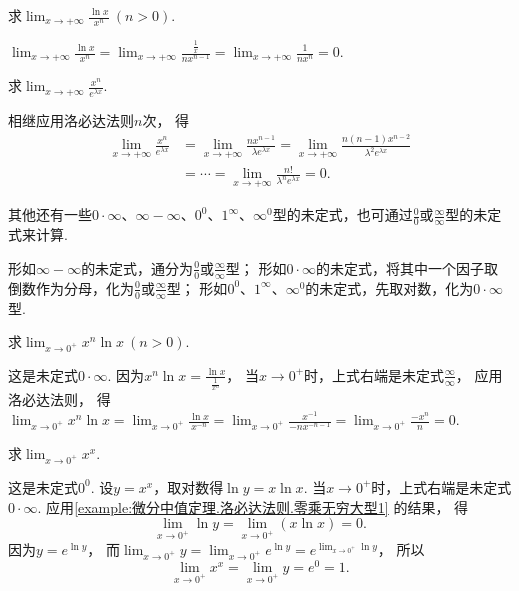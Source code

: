 \begin{example}
求\(\lim_{x\to+\infty} \frac{\ln x}{x^n}\ (n>0)\).
\begin{solution}
\(\lim_{x\to+\infty} \frac{\ln x}{x^n}
= \lim_{x\to+\infty} \frac{\frac{1}{x}}{n x^{n-1}}
= \lim_{x\to+\infty} \frac{1}{n x^n} = 0\).
\end{solution}
\end{example}

\begin{example}
求\(\lim_{x\to+\infty} \frac{x^n}{e^{\lambda x}}\).
\begin{solution}
相继应用洛必达法则\(n\)次，
得\begin{align*}
	\lim_{x\to+\infty} \frac{x^n}{e^{\lambda x}}
	&= \lim_{x\to+\infty} \frac{n x^{n-1}}{\lambda e^{\lambda x}}
	= \lim_{x\to+\infty} \frac{n(n-1) x^{n-2}}{\lambda^2 e^{\lambda x}} \\
	&= \dotsb = \lim_{x\to+\infty} \frac{n!}{\lambda^n e^{\lambda x}}
	= 0.
\end{align*}
\end{solution}
\end{example}

其他还有一些\(0 \cdot \infty\)、\(\infty - \infty\)、\(0^0\)、\(1^\infty\)、\(\infty^0\)型的未定式，也可通过\(\frac{0}{0}\)或\(\frac{\infty}{\infty}\)型的未定式来计算.

形如\(\infty - \infty\)的未定式，通分为\(\frac{0}{0}\)或\(\frac{\infty}{\infty}\)型；
形如\(0 \cdot \infty\)的未定式，将其中一个因子取倒数作为分母，化为\(\frac{0}{0}\)或\(\frac{\infty}{\infty}\)型；
形如\(0^0\)、\(1^\infty\)、\(\infty^0\)的未定式，先取对数，化为\(0 \cdot \infty\)型.

\begin{example}\label{example:微分中值定理.洛必达法则.零乘无穷大型1}
求\(\lim_{x\to0^+} x^n \ln x\ (n > 0)\).
\begin{solution}
这是未定式\(0\cdot\infty\).
因为\(x^n \ln x = \frac{\ln x}{\frac{1}{x^n}}\)，
当\(x\to0^+\)时，上式右端是未定式\(\frac{\infty}{\infty}\)，
应用洛必达法则，
得\(\lim_{x\to0^+} x^n \ln x
= \lim_{x\to0^+} \frac{\ln x}{x^{-n}}
= \lim_{x\to0^+} \frac{x^{-1}}{-nx^{-n-1}}
= \lim_{x\to0^+} \frac{-x^n}{n}
= 0\).
\end{solution}
\end{example}

\begin{example}\label{example:微分中值定理.洛必达法则.零次方零型1}
求\(\lim_{x\to0^+}{x^x}\).
\begin{solution}
这是未定式\(0^0\).
设\(y = x^x\)，取对数得\(\ln y = x \ln x\).
当\(x\to0^+\)时，上式右端是未定式\(0\cdot\infty\).
应用\cref{example:微分中值定理.洛必达法则.零乘无穷大型1} 的结果，
得\[
	\lim_{x\to0^+} \ln y
	= \lim_{x\to0^+} (x \ln x) = 0.
\]
因为\(y = e^{\ln y}\)，
而\(\lim_{x\to0^+} y
= \lim_{x\to0^+} e^{\ln y}
= e^{\lim_{x\to0^+} \ln y}\)，
所以\[
	\lim_{x\to0^+} x^x
	= \lim_{x\to0^+} y
	= e^0
	= 1.
\]
\end{solution}
\end{example}

